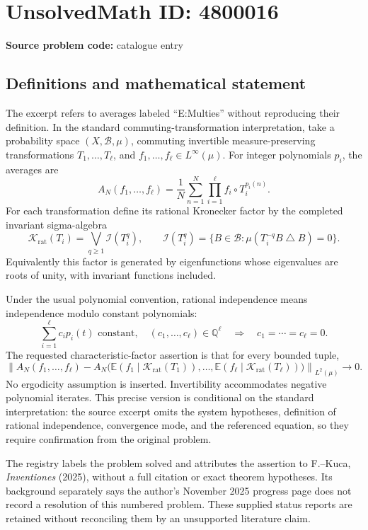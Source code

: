 \documentclass[11pt]{article}
\begin{document}
\section*{UnsolvedMath ID: 4800016}
\textbf{Source problem code:} catalogue entry
\subsection{Definitions and mathematical statement}
The excerpt refers to averages labeled ``E:Multies'' without reproducing their definition. In the standard commuting-transformation interpretation, take a probability space \((X,\mathcal B,\mu)\), commuting invertible measure-preserving transformations \(T_1,\ldots,T_\ell\), and \(f_1,\ldots,f_\ell\in L^\infty(\mu)\). For integer polynomials \(p_i\), the averages are
\[
 A_N(f_1,\ldots,f_\ell)=\frac1N\sum_{n=1}^N\prod_{i=1}^\ell f_i\circ T_i^{p_i(n)}.
\]
For each transformation define its rational Kronecker factor by the completed invariant sigma-algebra
\[
 \mathcal K_{\mathrm{rat}}(T_i)=\bigvee_{q\ge1}\mathcal I(T_i^q),
 \qquad
 \mathcal I(T_i^q)=\{B\in\mathcal B:\mu(T_i^{-q}B\mathbin{\triangle}B)=0\}.
\]
Equivalently this factor is generated by eigenfunctions whose eigenvalues are roots of unity, with invariant functions included.

Under the usual polynomial convention, rational independence means independence modulo constant polynomials:
\[
 \sum_{i=1}^{\ell}c_i p_i(t)\text{ constant},\quad(c_1,\ldots,c_\ell)\in\mathbb Q^\ell
 \quad\Longrightarrow\quad c_1=\cdots=c_\ell=0.
\]
The requested characteristic-factor assertion is that for every bounded tuple,
\[
 \left\|A_N(f_1,\ldots,f_\ell)
 -A_N\bigl(\mathbb E(f_1\mid\mathcal K_{\mathrm{rat}}(T_1)),\ldots,
 \mathbb E(f_\ell\mid\mathcal K_{\mathrm{rat}}(T_\ell))\bigr)\right\|_{L^2(\mu)}
 \longrightarrow0.
\]
No ergodicity assumption is inserted. Invertibility accommodates negative polynomial iterates. This precise version is conditional on the standard interpretation: the source excerpt omits the system hypotheses, definition of rational independence, convergence mode, and the referenced equation, so they require confirmation from the original problem.

The registry labels the problem solved and attributes the assertion to F.--Kuca, \emph{Inventiones} (2025), without a full citation or exact theorem hypotheses. Its background separately says the author's November 2025 progress page does not record a resolution of this numbered problem. These supplied status reports are retained without reconciling them by an unsupported literature claim.
\end{document}
